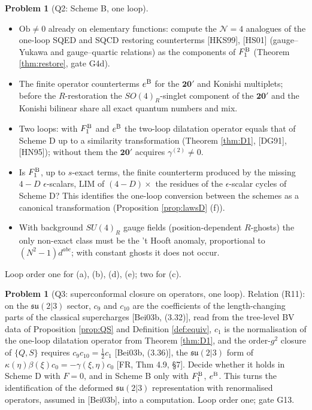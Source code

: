 \documentclass[11pt]{article}
\theoremstyle{definition}
\newtheorem{problem}[definition]{Problem}
\numberwithin{equation}{section}
\begin{document}
\begin{problem}[Q2: Scheme B, one loop]
\label{q:Q2}
\begin{itemize}
\item[(a)] $\mathrm{Ob}\neq0$ already on elementary functions: compute the $\mathcal N=4$ analogues of the one-loop SQED and SQCD restoring counterterms [HKS99], [HS01] (gauge--Yukawa and gauge--quartic relations) as the components of $F_1^{\rm B}$ (Theorem \ref{thm:restore}, gate G4d).
\item[(b)] The finite operator counterterms $e^{\rm B}$ for the $\mathbf{20}'$ and Konishi multiplets; before the $R$-restoration the $SO(4)_R$-singlet component of the $\mathbf{20}'$ and the Konishi bilinear share all exact quantum numbers and mix.
\item[(c)] Two loops: with $F_1^{\rm B}$ and $e^{\rm B}$ the two-loop dilatation operator equals that of Scheme D up to a similarity transformation (Theorem \ref{thm:D1}, [DG91], [HN95]); without them the $\mathbf{20}'$ acquires $\gamma^{(2)}\neq0$.
\item[(d)] Is $F_1^{\rm B}$, up to $s$-exact terms, the finite counterterm produced by the missing $4-D$ $\epsilon$-scalars, $\mathrm{LIM}$ of $(4-D)\times$ the residues of the $\epsilon$-scalar cycles of Scheme D? This identifies the one-loop conversion between the schemes as a canonical transformation (Proposition \ref{prop:lawsD} (f)).
\item[(e)] With background $SU(4)_R$ gauge fields (position-dependent $R$-ghosts) the only non-exact class must be the 't Hooft anomaly, proportional to $(N^2-1)d^{abc}$; with constant ghosts it does not occur.
\end{itemize}
Loop order one for (a), (b), (d), (e); two for (c).
\end{problem}

\begin{problem}[Q3: superconformal closure on operators, one loop]
\label{q:Q3}
Relation (R11): on the $\mathfrak{su}(2|3)$ sector, $c_9$ and $c_{10}$ are the coefficients of the length-changing parts of the classical supercharges [Bei03b, (3.32)], read from the tree-level BV data of Proposition \ref{prop:QS} and Definition \ref{def:equiv}, $c_1$ is the normalisation of the one-loop dilatation operator from Theorem \ref{thm:D1}, and the order-$g^2$ closure of $\{Q,S\}$ requires $c_9c_{10}=\frac12c_1$ [Bei03b, (3.36)], the $\mathfrak{su}(2|3)$ form of $\kappa(\eta)\beta(\xi)c_0=-\gamma(\xi,\eta)c_0$ [FR, Thm 4.9, §7]. Decide whether it holds in Scheme D with $F=0$, and in Scheme B only with $F_1^{\rm B}$, $e^{\rm B}$. This turns the identification of the deformed $\mathfrak{su}(2|3)$ representation with renormalised operators, assumed in [Bei03b], into a computation. Loop order one; gate G13.
\end{problem}
\end{document}
